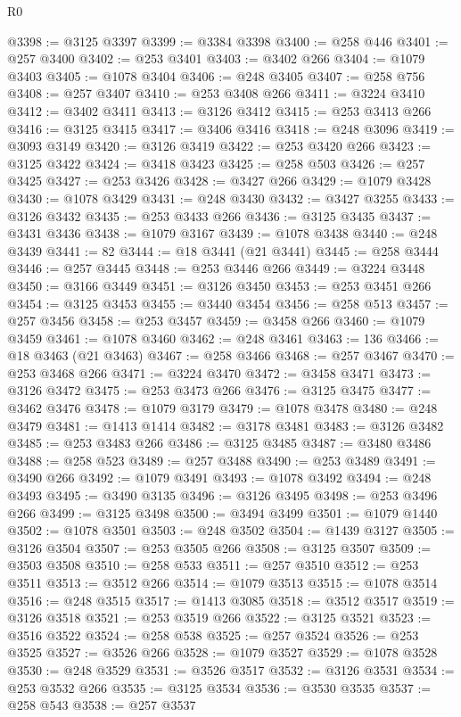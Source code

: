 \begin{lexlean}{R0}
\begin{coremodule}
@3398 := @3125 @3397
@3399 := @3384 @3398
@3400 := @258 @446
@3401 := @257 @3400
@3402 := @253 @3401
@3403 := @3402 @266
@3404 := @1079 @3403
@3405 := @1078 @3404
@3406 := @248 @3405
@3407 := @258 @756
@3408 := @257 @3407
@3410 := @253 @3408 @266
@3411 := @3224 @3410
@3412 := @3402 @3411
@3413 := @3126 @3412
@3415 := @253 @3413 @266
@3416 := @3125 @3415
@3417 := @3406 @3416
@3418 := @248 @3096
@3419 := @3093 @3149
@3420 := @3126 @3419
@3422 := @253 @3420 @266
@3423 := @3125 @3422
@3424 := @3418 @3423
@3425 := @258 @503
@3426 := @257 @3425
@3427 := @253 @3426
@3428 := @3427 @266
@3429 := @1079 @3428
@3430 := @1078 @3429
@3431 := @248 @3430
@3432 := @3427 @3255
@3433 := @3126 @3432
@3435 := @253 @3433 @266
@3436 := @3125 @3435
@3437 := @3431 @3436
@3438 := @1079 @3167
@3439 := @1078 @3438
@3440 := @248 @3439
@3441 := 82
@3444 := @18 @3441 (@21 @3441)
@3445 := @258 @3444
@3446 := @257 @3445
@3448 := @253 @3446 @266
@3449 := @3224 @3448
@3450 := @3166 @3449
@3451 := @3126 @3450
@3453 := @253 @3451 @266
@3454 := @3125 @3453
@3455 := @3440 @3454
@3456 := @258 @513
@3457 := @257 @3456
@3458 := @253 @3457
@3459 := @3458 @266
@3460 := @1079 @3459
@3461 := @1078 @3460
@3462 := @248 @3461
@3463 := 136
@3466 := @18 @3463 (@21 @3463)
@3467 := @258 @3466
@3468 := @257 @3467
@3470 := @253 @3468 @266
@3471 := @3224 @3470
@3472 := @3458 @3471
@3473 := @3126 @3472
@3475 := @253 @3473 @266
@3476 := @3125 @3475
@3477 := @3462 @3476
@3478 := @1079 @3179
@3479 := @1078 @3478
@3480 := @248 @3479
@3481 := @1413 @1414
@3482 := @3178 @3481
@3483 := @3126 @3482
@3485 := @253 @3483 @266
@3486 := @3125 @3485
@3487 := @3480 @3486
@3488 := @258 @523
@3489 := @257 @3488
@3490 := @253 @3489
@3491 := @3490 @266
@3492 := @1079 @3491
@3493 := @1078 @3492
@3494 := @248 @3493
@3495 := @3490 @3135
@3496 := @3126 @3495
@3498 := @253 @3496 @266
@3499 := @3125 @3498
@3500 := @3494 @3499
@3501 := @1079 @1440
@3502 := @1078 @3501
@3503 := @248 @3502
@3504 := @1439 @3127
@3505 := @3126 @3504
@3507 := @253 @3505 @266
@3508 := @3125 @3507
@3509 := @3503 @3508
@3510 := @258 @533
@3511 := @257 @3510
@3512 := @253 @3511
@3513 := @3512 @266
@3514 := @1079 @3513
@3515 := @1078 @3514
@3516 := @248 @3515
@3517 := @1413 @3085
@3518 := @3512 @3517
@3519 := @3126 @3518
@3521 := @253 @3519 @266
@3522 := @3125 @3521
@3523 := @3516 @3522
@3524 := @258 @538
@3525 := @257 @3524
@3526 := @253 @3525
@3527 := @3526 @266
@3528 := @1079 @3527
@3529 := @1078 @3528
@3530 := @248 @3529
@3531 := @3526 @3517
@3532 := @3126 @3531
@3534 := @253 @3532 @266
@3535 := @3125 @3534
@3536 := @3530 @3535
@3537 := @258 @543
@3538 := @257 @3537

\end{coremodule}
\end{lexlean}
